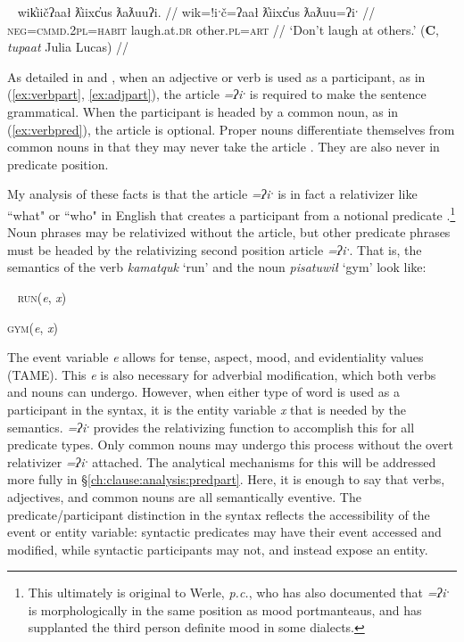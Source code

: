 \ex~ \label{ex:adjpart}
\begingl
\glpreamble wik̓iičʔaał ƛ̓iixc̓us ƛaƛuuʔi. //
\gla wik=!iˑč=ʔaał ƛ̓iixc̓us ƛaƛuu=ʔiˑ //
\glb \textsc{neg}=\textsc{cmmd.2pl}=\textsc{habit} laugh.at.\textsc{dr} other.\textsc{pl}=\textsc{art} //
\glft `Don't laugh at others.' (\textbf{C}, \textit{tupaat} Julia Lucas) //
\endgl
\xe


As detailed in \cite{jacobsen1979} and \cite{wojdak2001}, when an adjective or verb is used as a participant, as in (\ref{ex:verbpart}, \ref{ex:adjpart}), the article \textit{=ʔiˑ} is required to make the sentence grammatical. When the participant is headed by a common noun, as in (\ref{ex:verbpred}), the article is optional. Proper nouns differentiate themselves from common nouns in that they may never take the article \citep{inman2018}. They are also never in predicate position.

My analysis of these facts is that the article \textit{=ʔiˑ} is in fact a relativizer like ``what" or ``who" in English that creates a participant from a notional predicate \cite{inman2018}.\footnote{This ultimately is original to Werle, \textit{p.c.}, who has also documented that \textit{=ʔiˑ} is morphologically in the same position as mood portmanteaus, and has supplanted the third person definite mood in some dialects.} Noun phrases may be relativized without the article, but other predicate phrases must be headed by the relativizing second position article \textit{=ʔiˑ}. That is, the semantics of the verb \textit{kamatquk} `run' and the noun \textit{pisatuwił} `gym' look like:

\ex~
\textsc{run}(\textit{e}, \textit{x})

\textsc{gym}(\textit{e}, \textit{x})
\xe

The event variable \textit{e} allows for tense, aspect, mood, and evidentiality values (TAME). This \textit{e} is also necessary for adverbial modification, which both verbs and nouns can undergo. However, when either type of word is used as a participant in the syntax, it is the entity variable \textit{x} that is needed by the semantics. \textit{=ʔiˑ} provides the relativizing function to accomplish this for all predicate types. Only common nouns may undergo this process without the overt relativizer \textit{=ʔiˑ} attached. The analytical mechanisms for this will be addressed more fully in \S\ref{ch:clause:analysis:predpart}. Here, it is enough to say that verbs, adjectives, and common nouns are all semantically eventive. The predicate/participant distinction in the syntax reflects the accessibility of the event or entity variable: syntactic predicates may have their event accessed and modified, while syntactic participants may not, and instead expose an entity.

